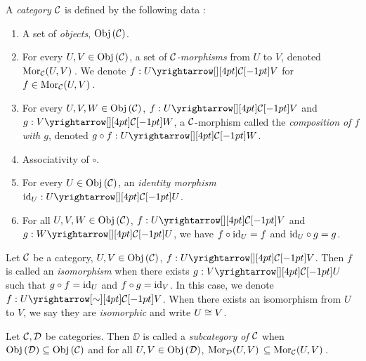 \begin{dfn}[Categories]
  
  A \emph{category $\mathcal{C}$} is defined by the following data : 
  \begin{enumerate}
    \item A set of \emph{objects}, $\mathrm{Obj}\left(\mathcal{C}\right)$. 
    \item For every $U, V \in \mathrm{Obj}\left(\mathcal{C}\right)$, 
    a set of \emph{$\mathcal{C}$-morphisms} from $U$ to $V$,
    denoted $\mathrm{Mor}_{\mathcal{C}}(U, V)\,$.
    We denote $f : \map{U}{V}{\CC}{}$ for $f \in \mathrm{Mor}_{\mathcal{C}}(U, V)\,$. 
    \item For every $U, V, W \in \mathrm{Obj}\left(\mathcal{C}\right)$, 
    $f : \map{U}{V}{\CC}{}$ and $g : \map{V}{W}{\CC}{}$, 
    a $\mathcal{C}$-morphism called the \emph{composition of $f$ with $g$},
    denoted $g \circ f : \map{U}{W}{\CC}{}$.
    \item Associativity of $\circ$.
    \item For every $U \in \mathrm{Obj}\left(\mathcal{C}\right)$, 
    an \emph{identity morphism} $\id{U} : \map{U}{U}{\CC}{}$.
    \item For all $U, V, W \in \mathrm{Obj}\left(\mathcal{C}\right)$, 
    $f : \map{U}{V}{\CC}{}$ and $g : \map{W}{U}{\CC}{}$, 
    we have $f \circ \mathrm{id}_{U} = f$ and $\mathrm{id}_{U} \circ g = g$. 
  \end{enumerate}
\end{dfn}

\begin{dfn}[Isomorphisms]
  
  Let $\mathcal{C}$ be a category, $U, V \in \mathrm{Obj}\left(\mathcal{C}\right)$, $f : \map{U}{V}{\CC}{}$.
  Then $f$ is called an \emph{isomorphism} when 
  there exists $g : \map{V}{U}{\CC}{}$ such that 
  $g \circ f = \mathrm{id}_{U}$ and $f \circ g = \mathrm{id}_{V}$.
  In this case, we denote $f : \map{U}{V}{\CC}{\sim}$.
  When there exists an isomorphism from $U$ to $V$, 
  we say they are \emph{isomorphic} and write $U \cong V$. 
\end{dfn}

\begin{dfn}[Subcategories]
  
  Let $\mathcal{C},\mathcal{D}$ be categories. 
  Then $\DD$ is called a \emph{subcategory of $\mathcal{C}$} when 
  $\mathrm{Obj}\left(\mathcal{D}\right) \subseteq \mathrm{Obj}\left(\mathcal{C}\right)$ and 
  for all $U,V \in \mathrm{Obj}\left(\mathcal{D}\right)$, $\mathrm{Mor}_{\mathcal{D}}(U, V)\, \subseteq \mathrm{Mor}_{\mathcal{C}}(U, V)\,$.
\end{dfn}

